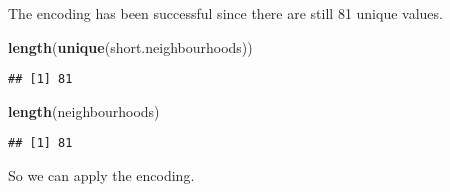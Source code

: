 \documentclass[]{article}
\newenvironment{Shaded}{\begin{snugshade}}{\end{snugshade}}
\newcommand{\KeywordTok}[1]{\textcolor[rgb]{0.13,0.29,0.53}{\textbf{#1}}}
\newcommand{\DataTypeTok}[1]{\textcolor[rgb]{0.13,0.29,0.53}{#1}}
\newcommand{\StringTok}[1]{\textcolor[rgb]{0.31,0.60,0.02}{#1}}
\newcommand{\OperatorTok}[1]{\textcolor[rgb]{0.81,0.36,0.00}{\textbf{#1}}}
\newcommand{\NormalTok}[1]{#1}
\begin{document}
The encoding has been successful since there are still 81 unique values.

\begin{Shaded}
\begin{Highlighting}[]
\KeywordTok{length}\NormalTok{(}\KeywordTok{unique}\NormalTok{(short.neighbourhoods))}
\end{Highlighting}
\end{Shaded}

\begin{verbatim}
## [1] 81
\end{verbatim}

\begin{Shaded}
\begin{Highlighting}[]
\KeywordTok{length}\NormalTok{(neighbourhoods)}
\end{Highlighting}
\end{Shaded}

\begin{verbatim}
## [1] 81
\end{verbatim}

So we can apply the encoding.

\begin{Shaded}
\end{Shaded}
\end{document}
